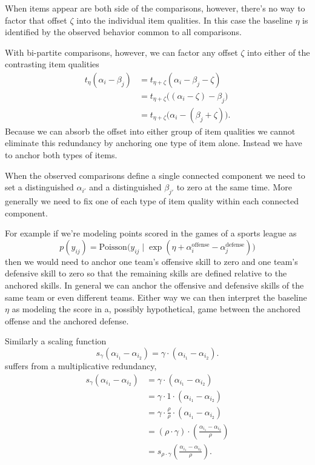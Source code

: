 \documentclass[
  letterpaper,
  DIV=11,
  numbers=noendperiod]{scrartcl}
\begin{document}
When items appear are both side of the comparisons, however, there's no
way to factor that offset \(\zeta\) into the individual item qualities.
In this case the baseline \(\eta\) is identified by the observed
behavior common to all comparisons.

With bi-partite comparisons, however, we can factor any offset \(\zeta\)
into either of the contrasting item qualities \begin{align*}
t_{\eta} ( \alpha_{i} - \beta_{j} )
&=
t_{\eta + \zeta} ( \alpha_{i} - \beta_{j} - \zeta )
\\
&=
t_{\eta + \zeta} \big( (\alpha_{i} - \zeta) - \beta_{j} \big)
\\
&=
t_{\eta + \zeta} \big( \alpha_{i} - (\beta_{j} + \zeta) \big).
\end{align*} Because we can absorb the offset into either group of item
qualities we cannot eliminate this redundancy by anchoring one type of
item alone. Instead we have to anchor both types of items.

When the observed comparisons define a single connected component we
need to set a distinguished \(\alpha_{i'}\) and a distinguished
\(\beta_{j'}\) to zero at the same time. More generally we need to fix
one of each type of item quality within each connected component.

For example if we're modeling points scored in the games of a sports
league as \[
p(y_{ij} ) =
\mathrm{Poisson}\big( y_{ij} \mid
                      \exp(  \eta
                           + \alpha_{i}^{\mathrm{offense}}
                           - \alpha_{j}^{\mathrm{defense}}
                          )
                \big)
\] then we would need to anchor one team's offensive skill to zero and
one team's defensive skill to zero so that the remaining skills are
defined relative to the anchored skills. In general we can anchor the
offensive and defensive skills of the same team or even different teams.
Either way we can then interpret the baseline \(\eta\) as modeling the
score in a, possibly hypothetical, game between the anchored offense and
the anchored defense.

Similarly a scaling function \[
s_{\gamma} (\alpha_{i_{1}} - \alpha_{i_{2}} )
=
\gamma \cdot (\alpha_{i_{1}} - \alpha_{i_{2}}).
\] suffers from a multiplicative redundancy, \begin{align*}
s_{\gamma} (\alpha_{i_{1}} - \alpha_{i_{2}} )
&=
\gamma \cdot (\alpha_{i_{1}} - \alpha_{i_{2}})
\\
&=
\gamma \cdot 1 \cdot (\alpha_{i_{1}} - \alpha_{i_{2}})
\\
&=
\gamma \cdot \frac{\rho}{\rho} \cdot (\alpha_{i_{1}} - \alpha_{i_{2}})
\\
&=
(\rho \cdot \gamma) \cdot
\left( \frac{\alpha_{i_{1}} - \alpha_{i_{2}}}{\rho} \right)
\\
&=
s_{\rho \cdot \gamma}
\left( \frac{\alpha_{i_{1}} - \alpha_{i_{2}}}{\rho} \right).
\end{align*}
\end{document}
